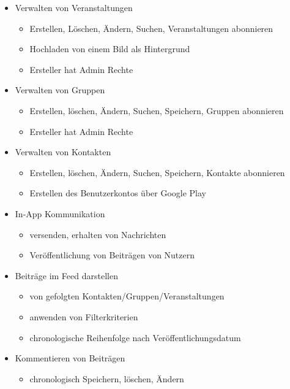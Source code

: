 \documentclass[parskip=full]{scrartcl}
\begin{document}
	\begin{itemize}
		\item Verwalten von Veranstaltungen
			\begin{itemize} 
				
				\item Erstellen, Löschen, Ändern, Suchen, Veranstaltungen abonnieren
				\item Hochladen von einem Bild als Hintergrund
				\item Ersteller hat Admin Rechte
			\end{itemize}
			
			\item Verwalten von Gruppen
				\begin{itemize}
					\item Erstellen, löschen, Ändern, Suchen, Speichern, Gruppen abonnieren
					\item Ersteller hat Admin Rechte
				\end{itemize}
			\item Verwalten von Kontakten
				\begin{itemize}
					\item Erstellen, löschen, Ändern, Suchen, Speichern, Kontakte abonnieren
					\item Erstellen des Benutzerkontos über Google Play
				\end{itemize}
			\item In-App Kommunikation
			\begin{itemize}
				\item versenden, erhalten von Nachrichten
				\item Veröffentlichung von Beiträgen von Nutzern
			\end{itemize}
			\item Beiträge im \gls{Feed} darstellen
				\begin{itemize}
					\item von gefolgten Kontakten/Gruppen/Veranstaltungen
					\item anwenden von Filterkriterien
					\item chronologische Reihenfolge nach Veröffentlichungsdatum
				\end{itemize}
			\item Kommentieren von Beiträgen
				\begin{itemize}
					\item chronologisch Speichern, löschen, Ändern
				\end{itemize}	
	\end{itemize}
	
\end{document}

